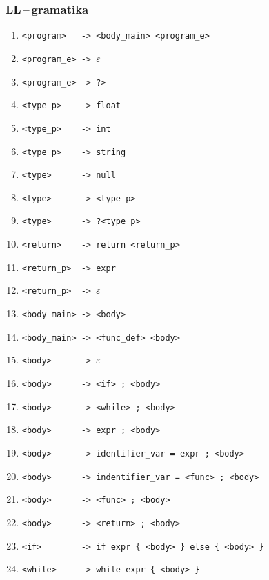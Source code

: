 \documentclass[a4paper,12pt]{article}
\begin{document}
\subsubsection{LL\,--\,gramatika}
\begin{table}[!ht]
	\centering
	\begin{enumerate}[noitemsep]
		\item \verb|<program>   -> <body_main> <program_e>|
		      		         
		\item \verb|<program_e> -> |$\varepsilon$
		\item \verb|<program_e> -> ?>|
		      		         
		\item \verb|<type_p>    -> float|
		\item \verb|<type_p>    -> int|
		\item \verb|<type_p>    -> string|
		\item \verb|<type>      -> null|
		\item \verb|<type>      -> <type_p>|
		\item \verb|<type>      -> ?<type_p>|
		      		      
		\item \verb|<return>    -> return <return_p>|
		\item \verb|<return_p>  -> expr|
		\item \verb|<return_p>  -> |$\varepsilon$
		      		         
		\item \verb|<body_main> -> <body>|
		\item \verb|<body_main> -> <func_def> <body>|
		      		         
		\item \verb|<body>      -> |$\varepsilon$
		\item \verb|<body>      -> <if> ; <body>|
		\item \verb|<body>      -> <while> ; <body>|
		\item \verb|<body>      -> expr ; <body>|
		\item \verb|<body>      -> identifier_var = expr ; <body>|
		\item \verb|<body>      -> indentifier_var = <func> ; <body>|
		\item \verb|<body>      -> <func> ; <body>|
		\item \verb|<body>      -> <return> ; <body>|
		      		         
		\item \verb|<if>        -> if expr { <body> } else { <body> }|
		\item \verb|<while>     -> while expr { <body> }|
		      		         

\end{enumerate}
\end{table}
\end{document}
